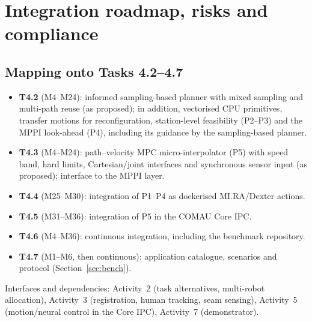 \section{Integration roadmap, risks and compliance}\label{sec:roadmap}

\subsection{Mapping onto Tasks 4.2--4.7}
\begin{itemize}
\item \textbf{T4.2} (M4--M24): informed sampling-based planner with mixed sampling and multi-path reuse (as proposed); in addition, vectorised CPU primitives, transfer motions for reconfiguration, station-level feasibility (P2--P3) and the MPPI look-ahead (P4), including its guidance by the sampling-based planner.
\item \textbf{T4.3} (M4--M24): path--velocity MPC micro-interpolator (P5) with speed band, hard limits, Cartesian/joint interfaces and synchronous sensor input (as proposed); interface to the MPPI layer.
\item \textbf{T4.4} (M25--M30): integration of P1--P4 as dockerised MI.RA/Dexter actions.
\item \textbf{T4.5} (M31--M36): integration of P5 in the COMAU Core IPC.
\item \textbf{T4.6} (M4--M36): continuous integration, including the benchmark repository.
\item \textbf{T4.7} (M1--M6, then continuous): application catalogue, scenarios and protocol (Section~\ref{sec:bench}).
\end{itemize}
Interfaces and dependencies: Activity~2 (task alternatives, multi-robot allocation), Activity~3 (registration, human tracking, seam sensing), Activity~5 (motion/neural control in the Core IPC), Activity~7 (demonstrator).

